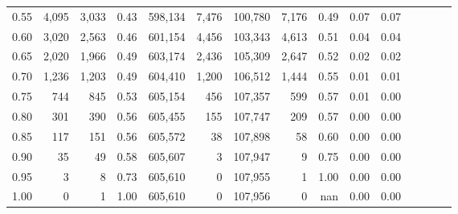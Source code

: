 \begin{tabular}{rrrcrrrrrrrrrrr}
0.55 &    4,095 &   3,033 &                                       0.43 &  598,134 &    7,476 &  100,780 &    7,176 &  0.49 &  0.07 &                         0.07 \\
0.60 &    3,020 &   2,563 &                                       0.46 &  601,154 &    4,456 &  103,343 &    4,613 &  0.51 &  0.04 &                         0.04 \\
0.65 &    2,020 &   1,966 &                                       0.49 &  603,174 &    2,436 &  105,309 &    2,647 &  0.52 &  0.02 &                         0.02 \\
0.70 &    1,236 &   1,203 &                                       0.49 &  604,410 &    1,200 &  106,512 &    1,444 &  0.55 &  0.01 &                         0.01 \\
0.75 &      744 &     845 &                                       0.53 &  605,154 &      456 &  107,357 &      599 &  0.57 &  0.01 &                         0.00 \\
0.80 &      301 &     390 &                                       0.56 &  605,455 &      155 &  107,747 &      209 &  0.57 &  0.00 &                         0.00 \\
0.85 &      117 &     151 &                                       0.56 &  605,572 &       38 &  107,898 &       58 &  0.60 &  0.00 &                         0.00 \\
0.90 &       35 &      49 &                                       0.58 &  605,607 &        3 &  107,947 &        9 &  0.75 &  0.00 &                         0.00 \\
0.95 &        3 &       8 &                                       0.73 &  605,610 &        0 &  107,955 &        1 &  1.00 &  0.00 &                         0.00 \\
1.00 &        0 &       1 &                                       1.00 &  605,610 &        0 &  107,956 &        0 &   nan &  0.00 &                         0.00 \\
\bottomrule
\end{tabular}
